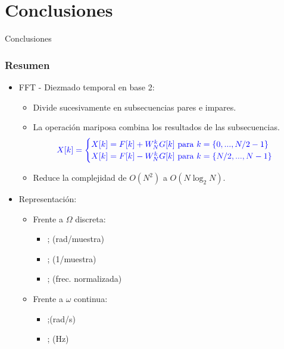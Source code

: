 \documentclass{beamer}
\numberwithin{section}{part}
\begin{document}
\section{Conclusiones}
\begin{frame}{Conclusiones}
\frametitle{Resumen}
  \begin{itemize}
    \item \alert{FFT - Diezmado temporal en base 2:}
    \begin{itemize}
      \item Divide sucesivamente en subsecuencias pares e impares.
      \item La operación mariposa combina los resultados de las subsecuencias.
      \[\color{blue}
      X[k] = 
      \begin{cases}
        X[k]=F[k] + W_N^k G[k]~\text{para}~k=\{0,...,N/2-1\}\\
        X[k]=F[k] - W_N^{k} G[k]~\text{para}~k=\{N/2,...,N-1\}
      \end{cases}
      \]
      \item Reduce la complejidad de \(O(N^2)\) a \(O(N \log_2 N)\).
    \end{itemize}
    \item \alert{Representación:}
    \begin{itemize}
      \item Frente a $\Omega$ discreta:
      \begin{itemize}
        \item {};\color{black} (rad/muestra) 
        \item {};\color{black}  (1/muestra)
        \item {};\color{black} (frec. normalizada) 
      \end{itemize}
      \item Frente a $\omega$ continua:
      \begin{itemize}
        \item {};\color{black}(rad/s) 
        \item {};\color{black} (Hz)
      \end{itemize}
  \end{itemize}
    \end{itemize}

\end{frame}
\end{document}
